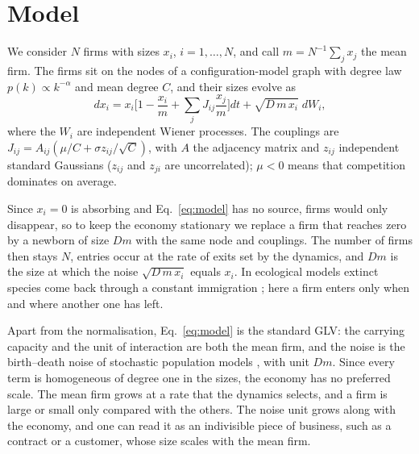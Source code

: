 \documentclass[pre,twocolumn,superscriptaddress,nofootinbib]{revtex4-2}
\begin{document}
\section{Model}
\label{sec:model}

We consider $N$ firms with sizes $x_i$, $i=1,\dots,N$, and call $m=N^{-1}\sum_jx_j$ the mean firm.
The firms sit on the nodes of a configuration-model graph with degree law $p(k)\propto k^{-\alpha}$ and
mean degree $C$, and their sizes evolve as
\begin{equation}
dx_i=x_i\Big[1-\frac{x_i}{m}+\sum_jJ_{ij}\frac{x_j}{m}\Big]dt+\sqrt{D\,m\,x_i}\;dW_i ,
\label{eq:model}
\end{equation}
where the $W_i$ are independent Wiener processes.  The couplings are $J_{ij}=A_{ij}(\mu/C+\sigma z_{ij}/\sqrt C)$,
with $A$ the adjacency matrix and $z_{ij}$ independent standard Gaussians ($z_{ij}$ and $z_{ji}$ are
uncorrelated); $\mu<0$ means that competition dominates on average.

Since $x_i=0$ is absorbing and Eq.~\eqref{eq:model} has no source, firms would only disappear, so to
keep the economy stationary we replace a firm that reaches zero by a newborn of size $Dm$ with the same
node and couplings.  The number of firms then stays $N$, entries occur at the rate of exits set by the
dynamics, and $Dm$ is the size at which the noise $\sqrt{D\,m\,x_i}$ equals $x_i$.  In
ecological models extinct species come back through a constant immigration \cite{altieri2021,bunin2017};
here a firm enters only when and where another one has left.

Apart from the normalisation, Eq.~\eqref{eq:model} is the standard GLV: the carrying capacity and the
unit of interaction are both the mean firm, and the noise is the birth--death noise of stochastic
population models \cite{altieri2021}, with unit $Dm$.  Since every term is homogeneous of degree one
in the sizes, the economy has no preferred scale.  The mean firm grows at a rate that the dynamics
selects, and a firm is large or small only compared with the others.  The noise unit grows along with
the economy, and one can read it as an indivisible piece of business, such as a contract or a
customer, whose size scales with the mean firm.
\end{document}
